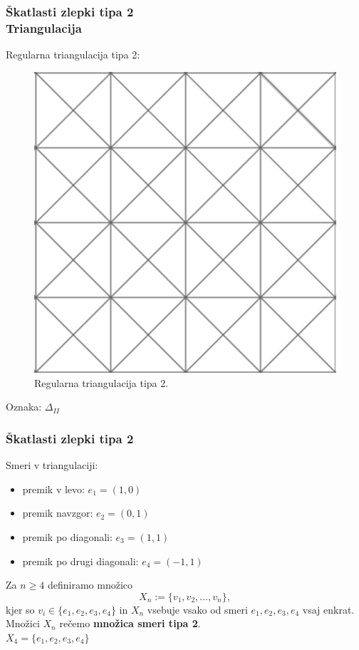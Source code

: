 \documentclass{beamer}
\begin{document}
\begin{frame}
\frametitle{Škatlasti zlepki tipa 2 \\ Triangulacija}

Regularna triangulacija tipa 2: 

\begin{figure}
    \centering
    \includegraphics[scale=0.23]{triangulacija2}
    \caption{Regularna triangulacija tipa 2.}
\end{figure}


Oznaka: $\Delta_{II}$ \\

\end{frame}

\begin{frame}
\frametitle{Škatlasti zlepki tipa 2}

Smeri v triangulaciji:
\begin{itemize}
\item premik v levo: $e_1 = (1,0)$
\item premik navzgor: $e_2 = (0,1)$
\item premik po diagonali: $e_3 = (1,1)$
\item premik po drugi diagonali: $e_4 = (-1,1)$
\end{itemize}

\vspace{5mm}

Za $n \geq 4$ definiramo množico  $$X_n := \{v_1, v_2, \ldots , v_n\},$$ kjer so $v_i \in \{e_1, e_2, e_3, e_4\}$ in $X_n$ vsebuje vsako od smeri $e_1, e_2, e_3, e_4$ vsaj enkrat. \\
Množici $X_n$ rečemo \textbf{množica smeri tipa 2}.\\
\vspace{4mm}
$X_4 = \{e_1,e_2, e_3, e_4\}$

\end{frame}
\end{document}
